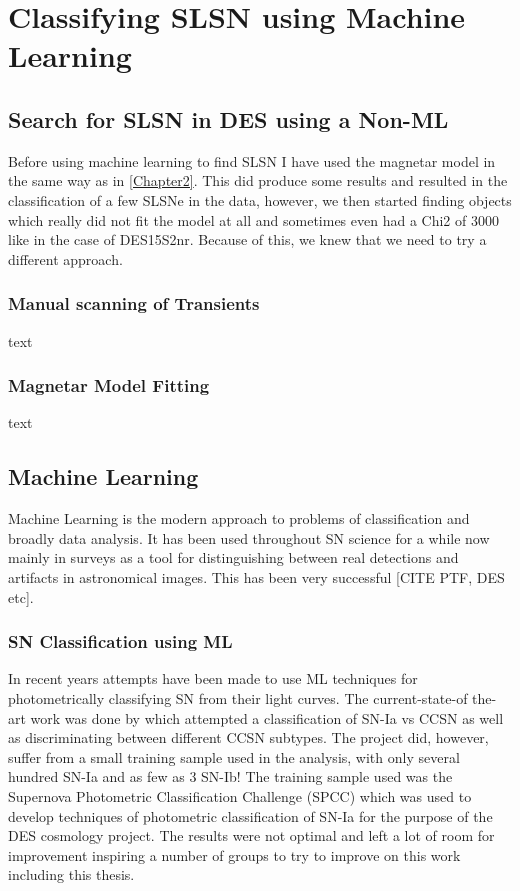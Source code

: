 \chapter{Classifying SLSN using Machine Learning}
\label{Chapter5}

\section{Search for SLSN in DES using a Non-ML}
Before using machine learning to find SLSN I have used the magnetar model in the same way as in \cref{Chapter2}. This did produce some results and resulted in the classification of a few SLSNe in the data, however, we then started finding objects which really did not fit the model at all and sometimes even had a Chi2 of 3000 like in the case of DES15S2nr. Because of this, we knew that we need to try a different approach.

\subsection{Manual scanning of Transients}
text
\subsection{Magnetar Model Fitting}
text

\section{Machine Learning}
Machine Learning is the modern approach to problems of classification and broadly data analysis. It has been used throughout SN science for a while now mainly in surveys as a tool for distinguishing between real detections and artifacts in astronomical images. This has been very successful [CITE PTF, DES etc].

\subsection{SN Classification using ML}
In recent years attempts have been made to use ML techniques for photometrically classifying SN from their light curves. The current-state-of the-art work was done by \citet{Lochner2016} which attempted a classification of SN-Ia vs CCSN as well as discriminating between different CCSN subtypes. The project did, however, suffer from a small training sample used in the analysis, with only several hundred SN-Ia and as few as 3 SN-Ib! The training sample used was the Supernova Photometric Classification Challenge (SPCC) \citep{Kessler2010} which was used to develop techniques of photometric classification of SN-Ia for the purpose of the DES cosmology project. The results were not optimal and left a lot of room for improvement inspiring a number of groups to try to improve on this work including this thesis.

